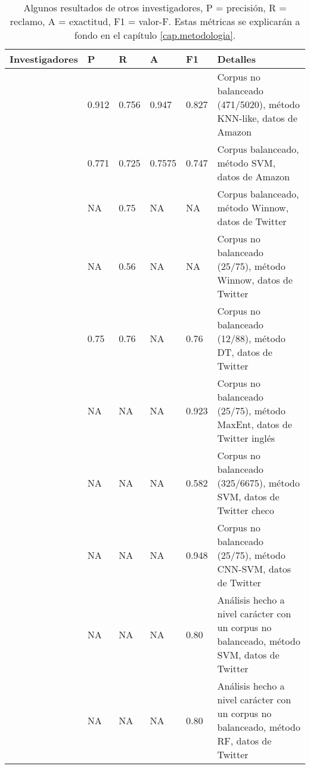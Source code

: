 \begin{table}[!ht]
	\begin{tabular}{|l|l|l|l|l|>{\raggedleft\arraybackslash}p{4cm}|}
		\hline
		Investigadores                  & P     & R     & A      & F1    & Detalles                                                                                  \\ \hline
		\textcite{davidov2010semi}      & 0.912 & 0.756 & 0.947  & 0.827 & Corpus no balanceado (471/5020), método  KNN-like, datos de Amazon                        \\ \hline
		\textcite{reyes2012making}      & 0.771 & 0.725 & 0.7575 & 0.747 & Corpus balanceado, método SVM, datos de  Amazon                                           \\ \hline
		\textcite{liebrecht2013perfect} & NA    & 0.75  & NA     & NA    & Corpus balanceado, método Winnow, datos de Twitter                                        \\ \hline
		\textcite{liebrecht2013perfect} & NA    & 0.56  & NA     & NA    & Corpus no balanceado (25/75), método Winnow, datos de Twitter                             \\ \hline
		\textcite{barbieri2014italian}  & 0.75  & 0.76  & NA     & 0.76  & Corpus no balanceado (12/88), método \gls{DT}, datos de  Twitter                          \\ \hline

		\textcite{ptavcek2014sarcasm}   & NA    & NA    & NA     & 0.923 & Corpus no balanceado (25/75), método  MaxEnt, datos de Twitter inglés                     \\ \hline
		\textcite{ptavcek2014sarcasm}   & NA    & NA    & NA     & 0.582 & Corpus no balanceado (325/6675), método  SVM, datos de Twitter checo                      \\ \hline
		\textcite{poria2016deeper}      & NA    & NA    & NA     & 0.948 & Corpus no balanceado (25/75), método  CNN-SVM, datos de Twitter                           \\ \hline
		\textcite{lopez2016character}   & NA    & NA    & NA     & 0.80  & Análisis hecho a nivel carácter con un corpus no balanceado, método SVM, datos de Twitter \\ \hline       \textcite{lopez2016character}      & NA        & NA     & NA        & 0.80     & Análisis hecho a nivel carácter con un corpus no balanceado, método RF, datos de Twitter                                                                                       \\ \hline
	\end{tabular}
	\caption{Algunos resultados de otros investigadores, P  = precisión, R = reclamo, A = exactitud, F1 = valor-F. Estas métricas se explicarán a fondo en el capítulo \ref{cap.metodologia}.}
	\label{tab:resultados}
\end{table}

